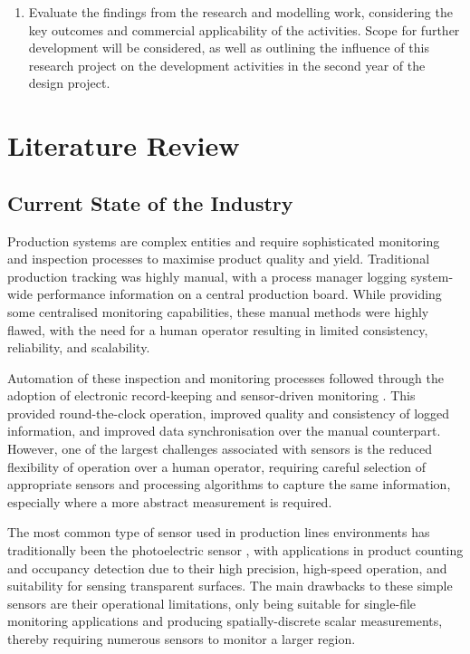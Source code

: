\documentclass[10pt]{article}
\begin{document}
\begin{enumerate}
    \item Evaluate the findings from the research and modelling work, considering the key outcomes and commercial applicability of the activities. Scope for further development will be considered, as well as outlining the influence of this research project on the development activities in the second year of the design project.
\end{enumerate}


\clearpage

\section{Literature Review}
\subsection{Current State of the Industry}
Production systems are complex entities and require sophisticated monitoring and inspection processes to maximise product quality and yield. Traditional production tracking was highly manual, with a process manager logging system-wide performance information on a central production board. While providing some centralised monitoring capabilities, these manual methods were highly flawed, with the need for a human operator resulting in limited consistency, reliability, and scalability.

Automation of these inspection and monitoring processes followed through the adoption of electronic record-keeping and sensor-driven monitoring \cite{deloitte-sensor}. This provided round-the-clock operation, improved quality and consistency of logged information, and improved data synchronisation over the manual counterpart. However, one of the largest challenges associated with sensors is the reduced flexibility of operation over a human operator, requiring careful selection of appropriate sensors and processing algorithms to capture the same information, especially where a more abstract measurement is required.

The most common type of sensor used in production lines environments has traditionally been the photoelectric sensor \cite{photoelectric}, with applications in product counting and occupancy detection due to their high precision, high-speed operation, and suitability for sensing transparent surfaces. The main drawbacks to these simple sensors are their operational limitations, only being suitable for single-file monitoring applications and producing spatially-discrete scalar measurements, thereby requiring numerous sensors to monitor a larger region.
\end{document}
